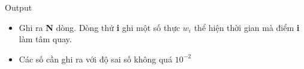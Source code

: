 Output
\begin{itemize}
	\item     Ghi ra    \textbf{     N    }    dòng. Dòng thứ    \textbf{     i    }    ghi một số thực    \textbf{     $w_{i}$}    thể hiện thời gian mà điểm    \textbf{     i    }    làm tâm quay.   
	\item     Các số cần ghi ra với độ sai số không quá $10^{-2}$
\end{itemize}